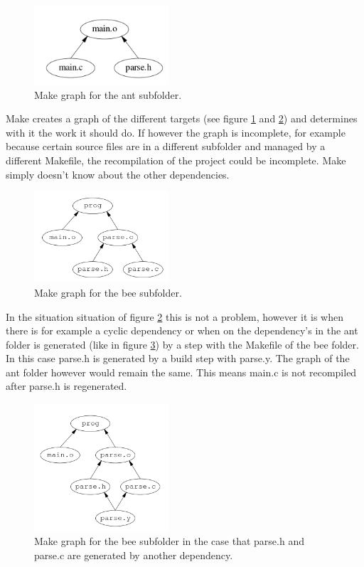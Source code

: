\begin{figure}
  \centering
  \includegraphics[width=5cm]{Images/makerec-graph-main.png}
  \caption{ Make graph for the ant subfolder. \cite{recmake}}
  \label{fig:recmake_graph-main}
\end{figure}

Make creates a graph of the different targets (see figure \ref{fig:recmake_graph-main} and \ref{fig:recmake_graph-bee}) and determines with it the work it should do. If however the graph is incomplete, for example because certain source files are in a different subfolder and managed by a different Makefile, the recompilation of the project could be incomplete. Make simply doesn't know about the other dependencies.


\begin{figure}[H]
  \centering
  \includegraphics[width=5cm]{Images/makerec-bee-graph.png}
  \caption{ Make graph for the bee subfolder. \cite{recmake}}
  \label{fig:recmake_graph-bee}
\end{figure}

In the situation situation of figure \ref{fig:recmake_graph-bee} this is not a problem, however it is when there is for example a cyclic dependency or when on the dependency's in the ant folder is generated (like in figure \ref{fig:recmake_graph-bee2}) by a step with the Makefile of the bee folder. In this case parse.h is generated by a build step with parse.y. The graph of the ant folder however would remain the same. This means main.c is not recompiled after parse.h is regenerated. 

\begin{figure}
  \centering
  \includegraphics[width=5cm]{Images/makerec-bee2-graph.png}
  \caption{ Make graph for the bee subfolder in the case that parse.h and parse.c are generated by another dependency. \cite{recmake}}
  \label{fig:recmake_graph-bee2}
\end{figure}